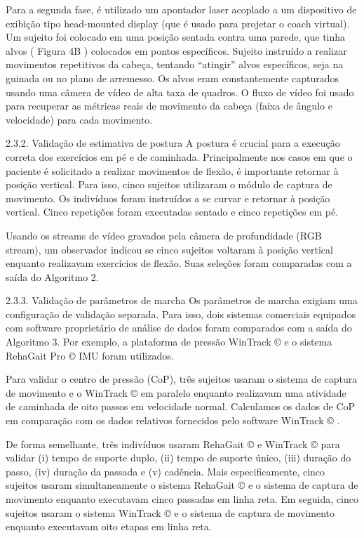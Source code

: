 \documentclass[10pt,a4paper,compsoc]{IEEEtran}
\begin{document}
Para a segunda fase, é utilizado um apontador laser acoplado a um dispositivo de exibição tipo head-mounted display (que é usado para projetar o coach virtual). Um sujeito foi colocado em uma posição sentada contra uma parede, que tinha alvos ( Figura 4B ) colocados em pontos específicos. Sujeito instruído a realizar movimentos repetitivos da cabeça, tentando “atingir” alvos específicos, seja na guinada ou no plano de arremesso. Os alvos eram constantemente capturados usando uma câmera de vídeo de alta taxa de quadros. O fluxo de vídeo foi usado para recuperar as métricas reais de movimento da cabeça (faixa de ângulo e velocidade) para cada movimento.

2.3.2. Validação de estimativa de postura
A postura é crucial para a execução correta dos exercícios em pé e de caminhada. Principalmente nos casos em que o paciente é solicitado a realizar movimentos de flexão, é importante retornar à posição vertical. Para isso, cinco sujeitos utilizaram o módulo de captura de movimento. Os indivíduos foram instruídos a se curvar e retornar à posição vertical. Cinco repetições foram executadas sentado e cinco repetições em pé.

Usando os streams de vídeo gravados pela câmera de profundidade (RGB stream), um observador indicou se cinco sujeitos voltaram à posição vertical enquanto realizavam exercícios de flexão. Suas seleções foram comparadas com a saída do Algoritmo 2.

2.3.3. Validação de parâmetros de marcha
Os parâmetros de marcha exigiam uma configuração de validação separada. Para isso, dois sistemas comerciais equipados com software proprietário de análise de dados foram comparados com a saída do Algoritmo 3. Por exemplo, a plataforma de pressão WinTrack © e o sistema RehaGait Pro © IMU foram utilizados.

Para validar o centro de pressão (CoP), três sujeitos usaram o sistema de captura de movimento e o WinTrack © em paralelo enquanto realizavam uma atividade de caminhada de oito passos em velocidade normal. Calculamos os dados de CoP em comparação com os dados relativos fornecidos pelo software WinTrack © .

De forma semelhante, três indivíduos usaram RehaGait © e WinTrack © para validar (i) tempo de suporte duplo, (ii) tempo de suporte único, (iii) duração do passo, (iv) duração da passada e (v) cadência. Mais especificamente, cinco sujeitos usaram simultaneamente o sistema RehaGait © e o sistema de captura de movimento enquanto executavam cinco passadas em linha reta. Em seguida, cinco sujeitos usaram o sistema WinTrack © e o sistema de captura de movimento enquanto executavam oito etapas em linha reta.
\end{document}
